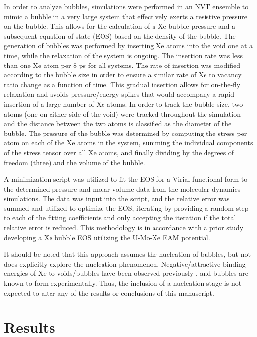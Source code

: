 \documentclass[review]{elsarticle}
\providecommand{\DIFaddtex}[1]{{\protect\color{blue} \sf #1}} %
\providecommand{\DIFaddbegin}{} %
\providecommand{\DIFaddend}{} %
\providecommand{\DIFadd}[1]{\texorpdfstring{\DIFaddtex{#1}}{#1}} %
\newcommand{\DIFaddincludegraphics}[2][]{{\color{blue}\fbox{\DIFOincludegraphics[#1]{#2}}}} %
\DeclareRobustCommand{\DIFaddbegin}{\DIFOaddbegin \let\includegraphics\DIFaddincludegraphics} %
\DeclareRobustCommand{\DIFaddend}{\DIFOaddend \let\includegraphics\DIFOincludegraphics} %
\begin{document}
In order to analyze bubbles, simulations were performed in an NVT ensemble to mimic a bubble in a very large system that effectively exerts a resistive pressure on the bubble. This allows for the calculation of a Xe bubble pressure and a subsequent equation of state (EOS) based on the density of the bubble. The generation of bubbles was performed by inserting Xe atoms into the void one at a time, while the relaxation of the system is ongoing. The insertion rate was less than one Xe atom per 8 ps for all systems. The rate of insertion was modified according to the bubble size in order to ensure a similar rate of Xe to vacancy ratio change as a function of time. \DIFaddbegin \DIFadd{This gradual insertion allows for on-the-fly relaxation and avoids pressure/energy spikes that would accompany a rapid insertion of a large number of Xe atoms. }\DIFaddend In order to track the bubble size, two atoms (one on either side of the void) were tracked throughout the simulation and the distance between the two atoms is classified as the diameter of the bubble. The pressure of the bubble was determined by computing the stress per atom on each of the Xe atoms in the system, summing the individual components of the stress tensor over all Xe atoms, and finally dividing by the degrees of freedom (three) and the volume of the bubble. 

A minimization script was utilized to fit the EOS for a Virial functional form to the determined pressure and molar volume data from the molecular dynamics simulations. The data was input into the script, and the relative error was summed and utilized to optimize the EOS, iterating by providing a random step to each of the fitting coefficients and only accepting the iteration if the total relative error is reduced. This methodology is in accordance with a prior study \cite{Beeler2020} developing a Xe bubble EOS utilizing the U-Mo-Xe EAM potential.

\DIFaddbegin \DIFadd{It should be noted that this approach assumes the nucleation of bubbles, but not does explicitly explore the nucleation phenomenon. Negative/attractive binding energies of Xe to voids/bubbles have been observed previously \cite{Beeler2020}, and bubbles are known to form experimentally. Thus, the inclusion of a nucleation stage is not expected to alter any of the results or conclusions of this manuscript. 
}

\DIFaddend \section{Results}
\end{document}
